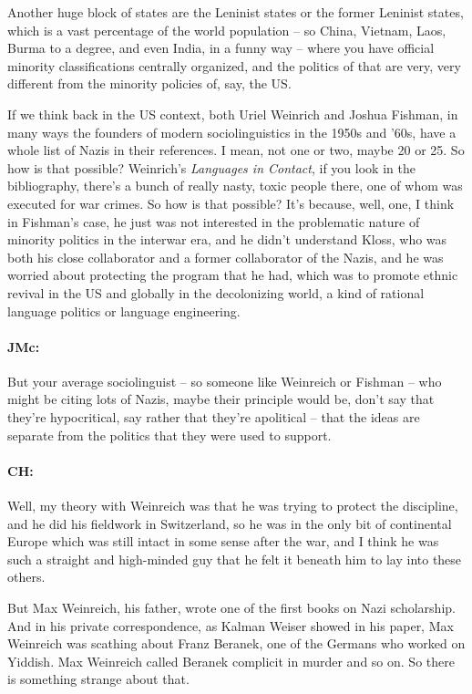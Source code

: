 \documentclass[output=paper]{langscibook}
\begin{document}
Another huge block of states are the Leninist states or the former Leninist states, which is a vast percentage of the world population – so China, Vietnam, Laos, Burma to a degree, and even India, in a funny way – where you have official minority classifications centrally organized, and the politics of that are very, very different from the minority policies of, say, the US. 

If we think back in the US context, both Uriel Weinrich and Joshua Fishman, in many ways the founders of modern sociolinguistics in the 1950s and ’60s, have a whole list of Nazis in their references. I mean, not one or two, maybe 20 or 25. So how is that possible? Weinrich’s \textit{Languages in Contact}, if you look in the bibliography, there’s a bunch of really nasty, toxic people there, one of whom was executed for war crimes. So how is that possible? It’s because, well, one, I think in Fishman’s case, he just was not interested in the problematic nature of minority politics in the interwar era, and he didn’t understand Kloss, who was both his close collaborator and a former collaborator of the Nazis, and he was worried about protecting the program that he had, which was to promote ethnic revival in the US and globally in the decolonizing world, a kind of rational language politics or language engineering.

\paragraph*{JMc:} But your average sociolinguist – so someone like Weinreich or Fishman – who might be citing lots of Nazis, maybe their principle would be, don’t say that they’re hypocritical, say rather that they’re apolitical – that the ideas are separate from the politics that they were used to support.

\paragraph*{CH:} Well, my theory with Weinreich was that he was trying to protect the discipline, and he did his fieldwork in Switzerland, so he was in the only bit of continental Europe which was still intact in some sense after the war, and I think he was such a straight and high-minded guy that he felt it beneath him to lay into these others.

But Max Weinreich, his father, wrote one of the first books on Nazi scholarship. And in his private correspondence, as Kalman Weiser showed in his \citeyear{weiser2018a} paper, Max Weinreich was scathing about Franz Beranek, one of the Germans who worked on Yiddish. Max Weinreich called Beranek complicit in murder and so on. So there is something strange about that. 
\end{document}

